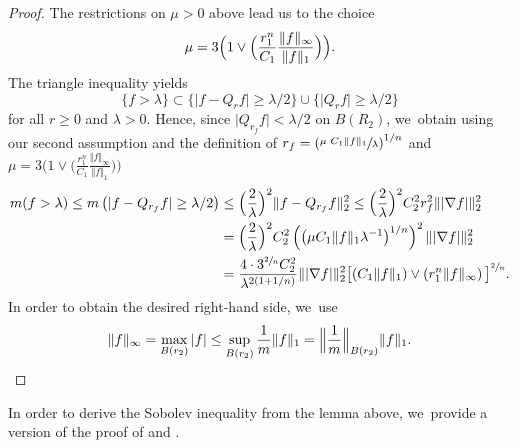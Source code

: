 \documentclass[10pt]{amsart}
\theoremstyle{plain}
\theoremstyle{definition}
\begin{document}
\begin{proof}
The restrictions on $\mu>0$ above lead us to the choice
\[
\mu= 3\Bigl(1\vee \Bigl(\frac{r_1^n}{C_1} \frac{\Vert f\Vert_\infty}{\Vert f\Vert_1}\Bigr)\Bigr).
\]
The triangle inequality yields
\[
\{f> \lambda \}\subset \{\vert f-Q_{r}f\vert \geq\lambda/2\}\cup\{\vert Q_{r}f\vert\geq \lambda/2\}
\]
for all $r\geq 0$ and $\lambda>0$. Hence, since $\vert Q_{r_f}f\vert <\lambda/2$ on $B (R_2)$, we~obtain using our second assumption and the definition of $ r_{f} =\left(\sfrac{\mu\ C_1\Vert f\Vert_1}{\lambda}\right)^{1/n}$ and \hbox{$ \mu=3\bigl(1\vee \bigl(\frac{r_1^n}{C_1} \frac{\Vert f\Vert_\infty}{\Vert f\Vert_1}\bigr)\bigr) $}
\begin{align*}
m(f>\lambda)
\leq m\left(\vert f-Q_{r_f}f\vert \geq \lambda/2\right)
&\leq \Bigl(\frac{2}{\lambda}\Bigr)^2\Vert f-Q_{r_f}f\Vert_2^2
\leq
\Bigl(\frac{2}{\lambda}\Bigr)^2C_2^2r_f^2\Vert| \nabla f|\Vert_2^2
\\
&=
\Bigl(\frac{2}{\lambda}\Bigr)^2
C_2^2
\left(\left(
\mu C_1\Vert f\Vert_1\lambda^{-1}\right)^{1/n}\right)^2\Vert| \nabla f|\Vert_2^2
\\
&= \frac{4\cdot 3^{\sfrac{2}{n}} C_2^2}{\lambda^{2(1+1/n)}}
\Vert |\nabla f|\Vert_2^2\big[
(C_1\Vert f\Vert_1)\vee \left(r_1^n \Vert f\Vert_\infty
\right)\big]^{\sfrac{2}{n}}.
\end{align*}
In order to obtain the desired right-hand side, we~use
\[
\Vert f\Vert_\infty=\max_{B(r_2)}|f|
\leq \sup_{B(r_2)}\frac1m \Vert f\Vert_1=\Bigl\Vert\frac1m\Bigr\Vert_{B(r_2)} \Vert f\Vert_1. \hfill\qedhere
\]
\end{proof}

In order to derive the Sobolev inequality from the lemma above, we~provide a version of the proof of \cite[Th.\,4.1]{BakryCLS-95} and \cite{Barlow-book,Delmotte-97}.
\end{document}
